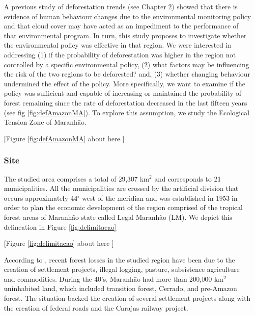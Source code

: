 A previous study of deforestation trends (see Chapter 2) showed that there is evidence of human behaviour changes due to the environmental monitoring policy and that cloud cover may have acted as an impediment to the performance of that environmental program. In turn, this study proposes to investigate whether the environmental policy was effective in that region. We were interested in addressing (1) if the probability of deforestation was higher in the region not controlled by a specific environmental policy, (2) what factors may be influencing the risk of the two regions to be deforested? and, (3) whether changing behaviour undermined the effect of the policy. More specifically, we want to examine if the policy was sufficient and capable of increasing or maintained the probability of forest remaining since the rate of deforestation decreased in the last fifteen years (see fig \ref{fig:defAmazonMA}). To explore this assumption, we study the Ecological Tension Zone of Maranhão.

[Figure \ref{fig:defAmazonMA} about here ]

\subsubsection{Site}
The studied area comprises a total of 29,307 km$^{2}$ and corresponds to 21 municipalities. All the municipalities are crossed by the artificial division that occurs approximately 44$^{\circ}$ west of the meridian and was established in 1953 in order to plan the economic development of the region comprised of the tropical forest areas of Maranhão state called Legal Maranhão (LM). We depict this delineation in Figure \ref{fig:delimitacao}

[Figure \ref{fig:delimitacao} about here ]

According to \citet{ferreira_2008, CELENTANO_2017, costa_2018}, recent forest losses in the studied region have been due to the creation of settlement projects, illegal logging, pasture, subsistence agriculture and commodities. During the 40's, Maranhão had more than 200,000 km$^{2}$ uninhabited land, which included transition forest, Cerrado, and pre-Amazon forest. The situation backed the creation of several settlement projects along with the creation of federal roads and the Carajas railway project.

